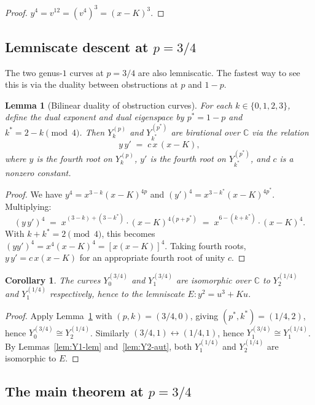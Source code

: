 \documentclass[11pt,a4paper]{article}
\theoremstyle{plain}
\newtheorem{lemma}[theorem]{Lemma}
\newtheorem{corollary}[theorem]{Corollary}
\theoremstyle{definition}
\theoremstyle{remark}
\newcommand{\C}{\mathbb{C}}
\begin{document}
\begin{proof}
$y^4 = v^{12} = (v^4)^3 = (x-K)^3$.
\end{proof}

\subsection*{Lemniscate descent at $p = 3/4$}

The two genus-$1$ curves at $p = 3/4$ are also lemniscatic. The fastest way to see this is via the duality between obstructions at $p$ and $1-p$.

\begin{lemma}[Bilinear duality of obstruction curves]\label{lem:duality}
For each $k \in \{0, 1, 2, 3\}$, define the dual exponent and dual eigenspace by $p^* = 1 - p$ and $k^* = 2 - k \pmod{4}$. Then $Y_k^{(p)}$ and $Y_{k^*}^{(p^*)}$ are birational over $\C$ via the relation
\[
  y\,y' \;=\; c\,x\,(x - K),
\]
where $y$ is the fourth root on $Y_k^{(p)}$, $y'$ is the fourth root on $Y_{k^*}^{(p^*)}$, and $c$ is a nonzero constant.
\end{lemma}

\begin{proof}
We have $y^4 = x^{3-k}(x-K)^{4p}$ and $(y')^4 = x^{3-k^*}(x-K)^{4p^*}$. Multiplying:
\[
  (y\,y')^4 \;=\; x^{(3-k)+(3-k^*)} \cdot (x-K)^{4(p + p^*)} \;=\; x^{6 - (k+k^*)} \cdot (x-K)^{4}.
\]
With $k + k^* = 2 \pmod 4$, this becomes $(yy')^4 = x^4 (x - K)^4 = [x(x-K)]^4$. Taking fourth roots, $y\,y' = c\,x(x-K)$ for an appropriate fourth root of unity $c$.
\end{proof}

\begin{corollary}\label{cor:lemniscate-34}
The curves $Y_0^{(3/4)}$ and $Y_1^{(3/4)}$ are isomorphic over $\C$ to $Y_2^{(1/4)}$ and $Y_1^{(1/4)}$ respectively, hence to the lemniscate $E\colon y^2 = u^3 + Ku$.
\end{corollary}

\begin{proof}
Apply Lemma~\ref{lem:duality} with $(p, k) = (3/4, 0)$, giving $(p^*, k^*) = (1/4, 2)$, hence $Y_0^{(3/4)} \cong Y_2^{(1/4)}$. Similarly $(3/4, 1) \leftrightarrow (1/4, 1)$, hence $Y_1^{(3/4)} \cong Y_1^{(1/4)}$. By Lemmas~\ref{lem:Y1-lem} and~\ref{lem:Y2-aut}, both $Y_1^{(1/4)}$ and $Y_2^{(1/4)}$ are isomorphic to $E$.
\end{proof}

\subsection*{The main theorem at $p = 3/4$}
\end{document}
